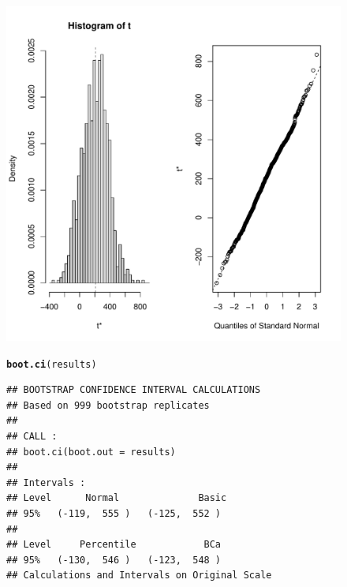\documentclass[10pt,handout]{beamer}\usepackage[]{graphicx}\usepackage[]{color}
\makeatletter
\def\maxwidth{ %
  \ifdim\Gin@nat@width>\linewidth
    \linewidth
  \else
    \Gin@nat@width
  \fi
}
\newcommand{\hlstd}[1]{\textcolor[rgb]{0.345,0.345,0.345}{#1}}%
\newcommand{\hlkwd}[1]{\textcolor[rgb]{0.737,0.353,0.396}{\textbf{#1}}}%
\newenvironment{kframe}{%
 \def\at@end@of@kframe{}%
 \ifinner\ifhmode%
  \def\at@end@of@kframe{\end{minipage}}%
  \begin{minipage}{\columnwidth}%
 \fi\fi%
 \def\FrameCommand##1{\hskip\@totalleftmargin \hskip-\fboxsep
 \colorbox{shadecolor}{##1}\hskip-\fboxsep
     \hskip-\linewidth \hskip-\@totalleftmargin \hskip\columnwidth}%
 \MakeFramed {\advance\hsize-\width
   \@totalleftmargin\z@ \linewidth\hsize
   \@setminipage}}%
 {\par\unskip\endMakeFramed%
 \at@end@of@kframe}
\newenvironment{knitrout}{}{} %
\makeatother
\begin{document}
\begin{frame}
\begin{figure}
\begin{minipage}[h]{0.50\linewidth}
\begin{knitrout}
{\centering \includegraphics[width=\maxwidth]{figure/unnamed-chunk-45-1} 

}


\begin{kframe}\begin{alltt}
\hlkwd{boot.ci}\hlstd{(results)}
\end{alltt}
\begin{verbatim}
## BOOTSTRAP CONFIDENCE INTERVAL CALCULATIONS
## Based on 999 bootstrap replicates
## 
## CALL : 
## boot.ci(boot.out = results)
## 
## Intervals : 
## Level      Normal              Basic         
## 95%   (-119,  555 )   (-125,  552 )  
## 
## Level     Percentile            BCa          
## 95%   (-130,  546 )   (-123,  548 )  
## Calculations and Intervals on Original Scale
\end{verbatim}
\end{kframe}
\end{knitrout}
		\end{minipage}
	\end{figure}
\end{frame}
\end{document}
